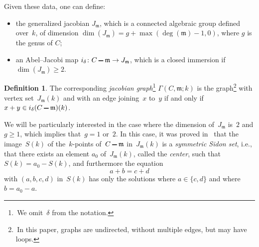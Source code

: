 \documentclass[12pt]{amsart}
\renewcommand{\geq}{\geqslant}
\numberwithin{equation}{section}
\def\setminus{\mathchoice
    {\mathbin{\vrule height .62ex width 1.61ex depth -.38ex}}%
    {\mathbin{\vrule height .62ex width 1.61ex depth -.38ex}}%
    {\mathbin{\vrule height .50ex width 0.85ex depth -.28ex}}%
    {\mathbin{\vrule height .20ex width 0.570ex depth -.24ex}}%
}
\newcommand{\mfm}{\mathfrak{m}}
\theoremstyle{plain}
\theoremstyle{remark}
\theoremstyle{definition}
\newtheorem{definition}[theorem]{Definition}
\renewcommand{\geq}{\geqslant}
\begin{document}
Given these data, one can define:
\begin{itemize}
\item the generalized jacobian $J_{\mfm}$, which is a connected algebraic group defined over~$k$, of dimension $\dim(J_{\mfm})=g+\max(\deg(\mfm)-1,0)$, where $g$ is the genus of $C$; 
\item an Abel--Jacobi map
$i_{\delta}\colon C\setminus \mfm\to J_{\mfm}$, which  is a closed
immersion if $\dim(J_{\mfm}) \geq 2$.  
\end{itemize}

\begin{definition} The corresponding \emph{jacobian graph}\footnote{\,We omit~$\delta$ from the notation.} $\Gamma(C,\mfm;k)$ is the
graph\footnote{\,In this paper, graphs are undirected, without multiple
  edges, but may have loops.} with vertex set~$J_{\mfm}(k)$ and with
an edge joining~$x$ to~$y$ if and only if $x+y\in i_{\delta}(C\setminus\mfm)(k)$. 
\end{definition}

We will be particularly interested in the case where the dimension
of~$J_{\mfm}$ is~$2$ and $g\geq 1$, which implies that~$g=1$ or~$2$.  In
this case, it was proved in~\cite{ffk2} that the image~$S(k)$
of the~$k$\nobreakdash-points of~$C\setminus \mfm$ in~$J_{\mfm}(k)$ is a \emph{symmetric Sidon set},
i.e., that there exists an element $a_0$ of~$J_{\mfm}(k)$, called the
\emph{center}, such that $S(k)=a_0-S(k)$, and furthermore the equation
\[
  a+b=c+d
\]
with $(a,b,c,d)$ in~$S(k)$ has only the solutions where $a\in \{c,d\}$
and where $b=a_0-a$.
\end{document}
